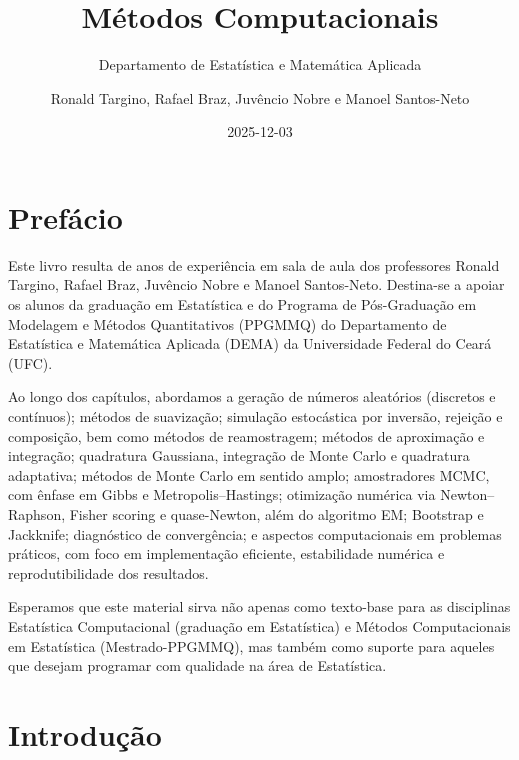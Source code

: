 \documentclass[
  letterpaper,
  DIV=11,
  numbers=noendperiod]{scrreprt}
\title{Métodos Computacionais}
\subtitle{Departamento de Estatística e Matemática Aplicada}
\author{Ronald Targino, Rafael Braz, Juvêncio Nobre e Manoel
Santos-Neto}
\date{2025-12-03}
\renewcommand*\contentsname{Índice}
\newcommand\contentsname{Índice}
\begin{document}
\maketitle

\renewcommand*\contentsname{Índice}
{
\hypersetup{linkcolor=}
\setcounter{tocdepth}{2}
\tableofcontents
}

\chapter*{Prefácio}\label{prefuxe1cio}


Este livro resulta de anos de experiência em sala de aula dos
professores Ronald Targino, Rafael Braz, Juvêncio Nobre e Manoel
Santos-Neto. Destina-se a apoiar os alunos da graduação em Estatística e
do Programa de Pós-Graduação em Modelagem e Métodos Quantitativos
(PPGMMQ) do Departamento de Estatística e Matemática Aplicada (DEMA) da
Universidade Federal do Ceará (UFC).

Ao longo dos capítulos, abordamos a geração de números aleatórios
(discretos e contínuos); métodos de suavização; simulação estocástica
por inversão, rejeição e composição, bem como métodos de reamostragem;
métodos de aproximação e integração; quadratura Gaussiana, integração de
Monte Carlo e quadratura adaptativa; métodos de Monte Carlo em sentido
amplo; amostradores MCMC, com ênfase em Gibbs e Metropolis--Hastings;
otimização numérica via Newton--Raphson, Fisher scoring e quase-Newton,
além do algoritmo EM; Bootstrap e Jackknife; diagnóstico de
convergência; e aspectos computacionais em problemas práticos, com foco
em implementação eficiente, estabilidade numérica e reprodutibilidade
dos resultados.

Esperamos que este material sirva não apenas como texto-base para as
disciplinas Estatística Computacional (graduação em Estatística) e
Métodos Computacionais em Estatística (Mestrado-PPGMMQ), mas também como
suporte para aqueles que desejam programar com qualidade na área de
Estatística.


\chapter{Introdução}\label{introduuxe7uxe3o}
\end{document}
